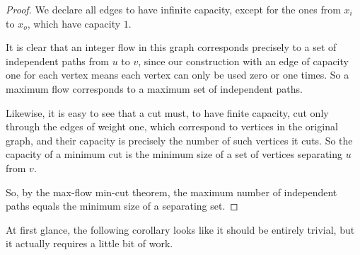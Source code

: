 \documentclass[nobib]{tufte-handout}
\begin{document}
\begin{theorem}[Menger]
\begin{proof}
    We declare all edges to have infinite capacity, except for the ones from $x_i$ to $x_o$, which have capacity $1$.

    It is clear that an integer flow in this graph corresponds precisely to a set of independent paths from $u$ to $v$, since our construction with an edge of capacity one for each vertex means each vertex can only be used zero or one times. So a maximum flow corresponds to a maximum set of independent paths.

    Likewise, it is easy to see that a cut must, to have finite capacity, cut only through the edges of weight one, which correspond to vertices in the original graph, and their capacity is precisely the number of such vertices it cuts. So the capacity of a minimum cut is the minimum size of a set of vertices separating $u$ from $v$.

    So, by the max-flow min-cut theorem, the maximum number of independent paths equals the minimum size of a separating set.
  \end{proof}
\end{theorem}

At first glance, the following corollary looks like it should be entirely trivial, but it actually requires a little bit of work.
\end{document}
